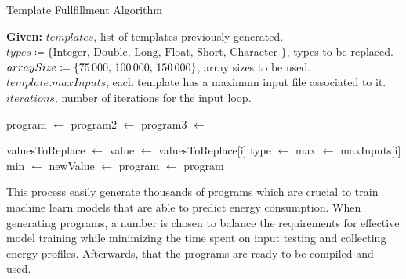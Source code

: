\begin{algorithm}[htbp]
\caption{Template Fullfillment Algorithm}
\label{alg:template_fullfillment_algorithm}
\begin{algorithmic}[1]
    \Statex \textbf{Given:}
    \Statex \hspace{\algorithmicindent} $templates$, list of templates previously generated.
    \Statex \hspace{\algorithmicindent} $types \coloneqq \{\text{Integer, Double, Long, Float, Short, Character }\}$, types to be replaced.
    \Statex \hspace{\algorithmicindent} $arraySize \coloneqq \{\text{75\,000, 100\,000, 150\,000}\}$, array sizes to be used.
    \Statex \hspace{\algorithmicindent} $template.maxInputs $, each template has a maximum input file associated to it.
    \Statex \hspace{\algorithmicindent} $iterations $, number of iterations for the input loop.

            \State program $\gets$ 
                    \State program2 $\gets$ 
                            \State program3 $\gets$ 
                            \State {}
                        \EndFor
                \EndFor
        \EndFor
    \EndFor
    
\EndProcedure

\vspace{1em} 

    \State valuesToReplace $\gets$ 
        \State value $\gets$ valuesToReplace[i]
        \State type $\gets$ 
        \State max $\gets$ maxInputs[i]
        \State min $\gets$ 
        \State newValue $\gets$ 
        \State program $\gets$ 
    \EndFor
    \State \Return program
\EndProcedure

\end{algorithmic}
\end{algorithm}

This process easily generate thousands of programs which are crucial to train machine learn models that are able to predict energy consumption. When generating programs, a number is chosen to balance the requirements for effective model training while minimizing the time spent on input testing and collecting energy profiles. Afterwards, that the programs are ready to be compiled and used.